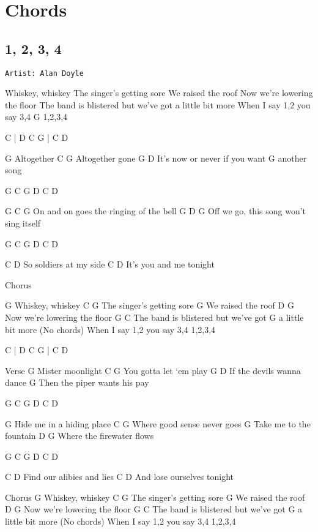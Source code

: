 \documentclass[11pt]{article}
\begin{document}
\clearpage

\section{Chords}
\label{sec:org1492c5c}
\subsection{1, 2, 3, 4}
\label{sec:org08ffae7}
\begin{verbatim}
Artist: Alan Doyle
\end{verbatim}
Whiskey, whiskey
The singer’s getting sore
We raised the roof
Now we’re lowering the floor
The band is blistered but we’ve got a little bit more
When I say 1,2 you say 3,4
G
1,2,3,4

C | D C
G | C D

G
Altogether
 C          G
Altogether gone
G                         D
It’s now or never if you want
       G
another song

G C G D C D

G                  C              G
On and on goes the ringing of the bell
G               D                 G
Off we go, this song won’t sing itself

G C G D C D

C                 D
So soldiers at my side
C                D
It’s you and me tonight

Chorus

G
Whiskey, whiskey
    C                G
The singer’s getting sore
   G
We raised the roof
           D           G
Now we’re lowering the floor
     G                           C
The band is blistered but we’ve got
              G
 a little bit more
(No chords)
When I say 1,2 you say 3,4
1,2,3,4

C | D C
G | C D

Verse
G
Mister moonlight
    C             G
You gotta let ‘em play
G                   D
If the devils wanna dance
                         G
Then the piper wants his pay

G C G D C D

G
Hide me in a hiding place
      C                G
Where good sense never goes
G
Take me to the fountain
          D         G
Where the firewater flows

G C G D C D

         C           D
Find our alibies and lies
    C                D
And lose ourselves tonight

Chorus
G
Whiskey, whiskey
    C                G
The singer’s getting sore
G
We raised the roof
          D            G
Now we’re lowering the floor
    G                           C
The band is blistered but we’ve got
              G
 a little bit more
(No chords)
When I say 1,2 you say 3,4
1,2,3,4
\end{document}
